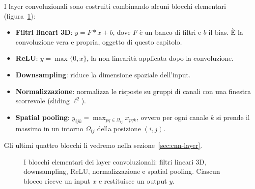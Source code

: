 I layer convoluzionali sono costruiti combinando alcuni blocchi elementari (figura~\ref{fig:cnn-blocchi}):
\begin{itemize}
    \item \textbf{Filtri lineari 3D}: $y = F * x + b$, dove $F$ è un banco di filtri e $b$ il bias. È la convoluzione vera e propria, oggetto di questo capitolo.
    \item \textbf{ReLU}: $y = \max\{0, x\}$, la non linearità applicata dopo la convoluzione.
    \item \textbf{Downsampling}: riduce la dimensione spaziale dell'input.
    \item \textbf{Normalizzazione}: normalizza le risposte su gruppi di canali con una finestra scorrevole (sliding $\ell^2$).
    \item \textbf{Spatial pooling}: $y_{ijk} = \max_{pq \in \Omega_{ij}} x_{pqk}$, ovvero per ogni canale $k$ si prende il massimo in un intorno $\Omega_{ij}$ della posizione $(i, j)$.
\end{itemize}
Gli ultimi quattro blocchi li vedremo nella sezione~\ref{sec:cnn-layer}.

\begin{figure}[htbp]
\centering
{}
\caption{I blocchi elementari dei layer convoluzionali: filtri lineari 3D, downsampling, ReLU, normalizzazione e spatial pooling. Ciascun blocco riceve un input $x$ e restituisce un output $y$.}
\label{fig:cnn-blocchi}
\end{figure}


